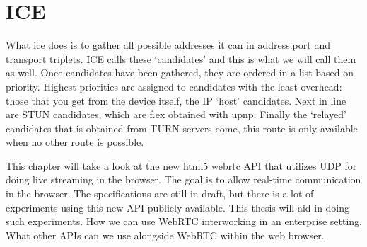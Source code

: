 \section{ICE}
What \gls{ice} does is to gather all possible addresses it can in address:port and transport triplets\cite{Ivov2013Ice}. ICE calls these `candidates' and this is what we will call them as well. Once candidates have been gathered, they are ordered in a list based on priority. Highest priorities are assigned to candidates with the least overhead: those that you get from the device itself, the IP `host' candidates. Next in line are STUN candidates, which are f.ex obtained with \gls{upnp}. Finally the `relayed' candidates that is obtained from TURN servers come, this route is only available when no other route is possible.





This chapter will take a look at the new {html5} {webrtc} API that utilizes UDP for doing live streaming in the browser. The goal is to allow real-time communication in the browser. The specifications are still in draft, but there is a lot of experiments using this new API publicly available. This thesis will aid in doing such experiments. How we can use WebRTC interworking in an enterprise setting. What other APIs can we use alongside WebRTC within the web browser.

